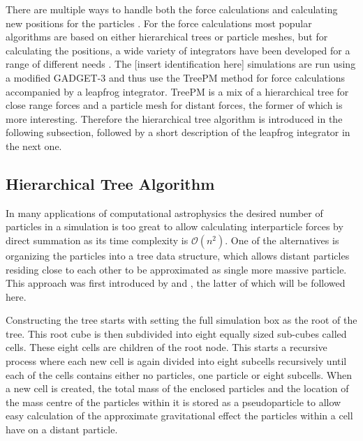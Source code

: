 \documentclass[english, oneside]{HYgradu}
\begin{document}
There are multiple ways to handle both the force calculations and calculating new positions for the particles \citep{binney2008galactic}. For the force calculations most popular algorithms are based on either hierarchical trees or particle meshes, but for calculating the positions, a wide variety of integrators have been developed for a range of different needs \citep{binney2008galactic}. The [insert identification here] %
simulations are run using a modified GADGET-3 and thus use the TreePM method for force calculations accompanied by a leapfrog integrator. TreePM is a mix of a hierarchical tree for close range forces and a particle mesh for distant forces, the former of which is more interesting. Therefore the \citet{barnes1986hierarchical} hierarchical tree algorithm is introduced in the following subsection, followed by a short description of the leapfrog integrator in the next one.

\subsection{Hierarchical Tree Algorithm} \label{sect:tree}
In many applications of computational astrophysics the desired number of particles in a simulation is too great to allow calculating interparticle forces by direct summation as its time complexity is $\mathcal{O}(n^2)$. One of the alternatives is organizing the particles into a tree data structure, which allows distant particles residing close to each other to be approximated as single more massive particle. This approach was first introduced by \citet{appel1985efficient} and \citet{barnes1986hierarchical}, the latter of which will be followed here.

Constructing the tree starts with setting the full simulation box as the root of the tree. This root cube is then subdivided into eight equally sized sub-cubes called cells. These eight cells are children of the root node. This starts a recursive process where each new cell is again divided into eight subcells recursively until each of the cells contains either no particles, one particle or eight subcells. When a new cell is created, the total mass of the enclosed particles and the location of the mass centre of the particles within it is stored as a pseudoparticle to allow easy calculation of the approximate gravitational effect the particles within a cell have on a distant particle.
\end{document}
